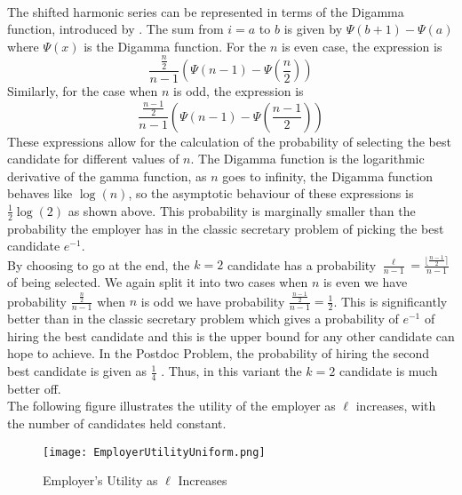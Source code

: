 \documentclass{article}
\begin{document}
\\[2ex]
The shifted harmonic series can be represented in terms of the Digamma function, introduced by \cite{stirling1730methodus}. The sum from $i = a$ to $b$ is given by $\Psi(b+1) - \Psi(a)$ where $\Psi(x)$ is the Digamma function. For the $n$ is even case, the expression is 
$$ \frac{\frac{n}{2}}{n-1} (\Psi(n-1) - \Psi( \frac{n}{2}))$$
Similarly, for the case when $n$ is odd, the expression is 
$$ \frac{\frac{n-1}{2}}{n-1} (\Psi(n-1) - \Psi( \frac{n-1}{2}))$$
These expressions allow for the calculation of the probability of selecting the best candidate for different values of $n$. The Digamma function is the logarithmic derivative of the gamma function, as $n$ goes to infinity, the Digamma function behaves like $\log(n)$, so the asymptotic behaviour of these expressions is $\frac{1}{2}\log(2)$ as shown above. This probability is marginally smaller than the probability the employer has in the classic secretary problem of picking the best candidate $e^{-1}$.
\\[2ex]
By choosing to go at the end, the $k=2$ candidate has a probability $\frac{\ell}{n-1} = \frac{\lfloor \frac{n-1}{2} \rceil}{n-1}$ of being selected. We again split it into two cases when $n$ is even we have probability $\frac{\frac{n}{2}}{n-1}$ when $n$ is odd we have probability $\frac{\frac{n-1}{2}}{n-1}=\frac{1}{2}$. This is significantly better than in the classic secretary problem which gives a probability of $e^{-1}$ of hiring the best candidate and this is the upper bound for any other candidate can hope to achieve. In the Postdoc Problem, the probability of hiring the second best candidate is given as $\frac{1}{4}$ \cite{vanderbei1983postdoc}. Thus, in this variant the $k=2$ candidate is much better off.
\\[2ex]
The following figure illustrates the utility of the employer as $\ell$ increases, with the number of candidates held constant.


\begin{figure}[H]
\centering
\texttt{[image: EmployerUtilityUniform.png]}
\caption{Employer's Utility as $\ell$ Increases}
\label{fig:Employer_utility_uniform}
\end{figure}
\end{document}
